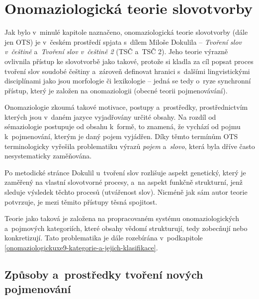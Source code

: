 \hypertarget{onomaziologickuxe1-teorie-slovotvorby}{%
\chapter{Onomaziologická teorie
slovotvorby}\label{onomaziologickuxe1-teorie-slovotvorby}}

Jak bylo v~minulé kapitole naznačeno, onomaziologická teorie slovotvorby
(dále jen OTS) je v~českém prostředí spjata s~dílem Miloše Dokulila --
\emph{Tvoření slov v~češtině} a~\emph{Tvoření slov v~češtině 2} (TSČ
a~TSČ 2). Jeho teorie výrazně ovlivnila přístup ke slovotvorbě jako
takové, protože si kladla za cíl popsat proces tvoření slov soudobé
češtiny a~zároveň definovat hranici s~dalšími lingvistickými
disciplínami jako jsou morfologie či lexikologie -- jedná se tedy o~ryze
synchronní přístup, který je založen na onomaziologii (obecné teorii
pojmenovávání).~\parencite{enc-ots17}

Onomaziologie zkoumá takové motivace, postupy a~prostředky,
prostřednictvím kterých jsou v~daném jazyce vyjadřovány určité obsahy.
Na rozdíl od sémaziologie postupuje od obsahu k~formě, to znamená, že
vychází od pojmu k~pojmenování, kterým je daný pojem vyjádřen.
\parencite{enc-onomaz17} Díky těmto termínům OTS terminologicky vyřešila
problematiku výrazů \emph{pojem} a~\emph{slovo}, která byla dříve často
nesystematicky zaměňována.~\parencite[267]{rousinova07}

Po metodické stránce Dokulil u~tvoření slov rozlišuje aspekt genetický,
který je zaměřený na vlastní slovotvorné procesy, a~na aspekt funkčně
strukturní, jenž sleduje výsledek těchto procesů (utvářenost slov).
Nicméně jak sám autor teorie potvrzuje, je mezi těmito přístupy těsná
spojitost.~\parencite[9]{dokulil62}

Teorie jako taková je založena na propracovaném systému
onomaziologických a~pojmových kategoriích, které obsahy vědomí
strukturují, tedy zobecňují nebo konkretizují.
\parencite{enc-onomaz-kateg17} Tato problematika je dále rozebírána
v~podkapitole \ref{onomaziologickuxe9-kategorie-a-jejich-klasifikace}.

\hypertarget{zpux16fsoby-a-prostux159edky-tvoux159enuxed-novuxfdch-pojmenovuxe1nuxed}{%
\section{Způsoby a~prostředky tvoření nových
pojmenování}\label{zpux16fsoby-a-prostux159edky-tvoux159enuxed-novuxfdch-pojmenovuxe1nuxed}}

